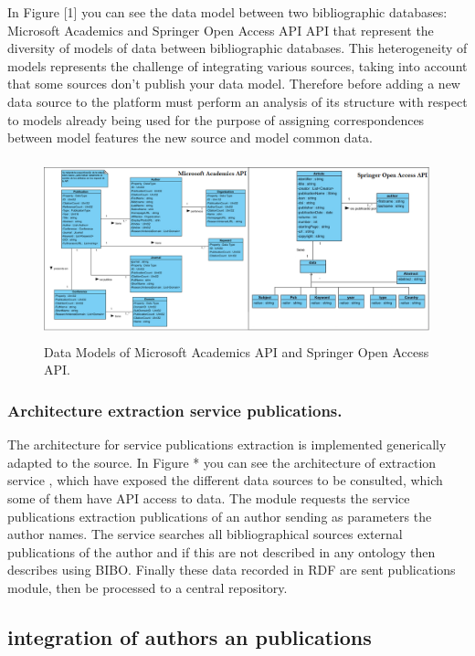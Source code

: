 \documentclass[11pt]{article}
\begin{document}
In Figure [1] you can see the data model between two bibliographic databases: Microsoft Academics and Springer Open Access API API that represent the diversity of models of data between bibliographic databases. This heterogeneity of models represents the challenge of integrating various sources, taking into account that some sources don't publish your data model. Therefore before adding a new data source to the platform must perform an analysis of its structure with respect to models already being used for the purpose of assigning correspondences between model features the new source and model common data.
 \begin{figure}[ht!]
	\centering
		\includegraphics[height=5.2cm]{modelosMA_Springer.png}
	\caption{Data Models of Microsoft Academics API and Springer Open Access API.}
	\label{fig:Escudo2}
\end{figure}

\subsubsection{Architecture extraction service publications.}

The architecture for service publications extraction is implemented generically adapted to the source. In Figure * you can see the architecture of extraction service , which have exposed the different data sources to be consulted, which some of them have API access to data. The module requests the service publications extraction publications of an author sending as parameters the author names. The service searches all bibliographical sources external publications of the author and if this are not described in any ontology then describes using BIBO. Finally these data recorded in RDF are sent publications module, then be processed to a central repository.



\subsection{integration of authors an publications}
\end{document}
